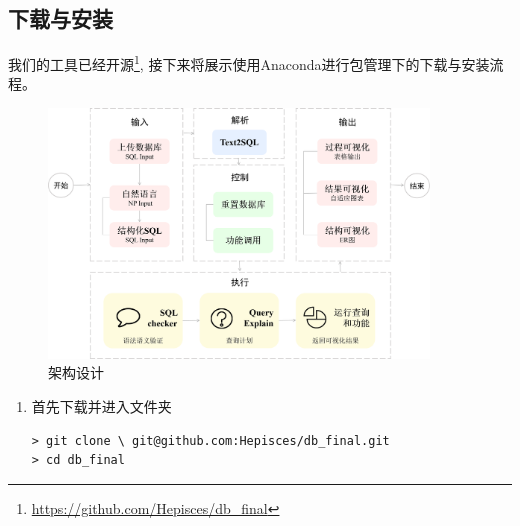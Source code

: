 
\begin{CJK*}{UTF8}{song}

{\begin{CJK*}{UTF8}{zhhei}\subsection{下载与安装}\end{CJK*}}

我们的工具已经开源\footnote{
\url{https://github.com/Hepisces/db_final}}, 接下来将展示使用Anaconda进行包管理下的下载与安装流程。

\begin{figure}
  \centering
  \includegraphics[width=0.9\textwidth]{article/presentation/figures/pipeline}
  \caption{架构设计}
  \label{fig:pipeline}
\end{figure}

\begin{enumerate}
    \item 首先下载并进入文件夹

\begin{lstlisting}
> git clone \ git@github.com:Hepisces/db_final.git
> cd db_final
\end{lstlisting}


\end{enumerate}
\end{CJK*}
